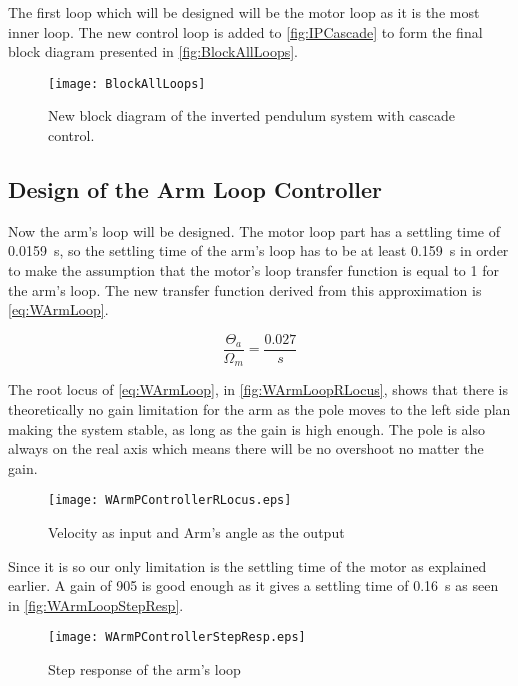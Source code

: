 The first loop which will be designed will be the motor loop as it is the most inner loop. The new control loop is added to \autoref{fig:IPCascade} to form the final block diagram presented in \autoref{fig:BlockAllLoops}.

\begin{figure}[htbp]
	\centering
	\texttt{[image: BlockAllLoops]}
	\caption{New block diagram of the inverted pendulum system with cascade control.}
	\label{fig:BlockAllLoops}
\end{figure}



\subsection{Design of the Arm Loop Controller}
Now the arm's loop will be designed. The motor loop part has a settling time of \SI{0.0159}{\second}, so the settling time of the arm's loop has to be at least \SI{0.159}{\second} in order to make the assumption that the motor's loop transfer function is equal to 1 for the arm's loop. The new transfer function derived from this approximation is \autoref{eq:WArmLoop}.

\begin{equation}\label{eq:WArmLoop}
	\frac{\Theta_a}{\Omega_m}=\frac{0.027}{s}
\end{equation}

The root locus of \autoref{eq:WArmLoop}, in \autoref{fig:WArmLoopRLocus}, shows that there is theoretically no gain limitation for the arm as the pole moves to the left side plan making the system stable, as long as the gain is high enough. The pole is also always on the real axis which means there will be no overshoot no matter the gain.

\begin{figure} [htbp] 
	\centering
	\texttt{[image: WArmPControllerRLocus.eps]}
	\caption{Velocity as input and Arm's angle as the output}
	\label{fig:WArmLoopRLocus}
\end{figure}

Since it is so our only limitation is the settling time of the motor as explained earlier. A gain of 905 is good enough as it gives a settling time of \SI{0.16}{\second} as seen in \autoref{fig:WArmLoopStepResp}.

\begin{figure} [htbp] 
	\centering
	\texttt{[image: WArmPControllerStepResp.eps]}
	\caption{Step response of the arm's loop}
	\label{fig:WArmLoopStepResp}
\end{figure}

